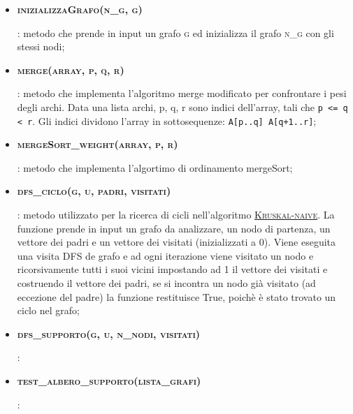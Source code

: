 \begin{itemize}
    
    \item \hypertarget{inizializzagrafo}{\textbf{\textsc{inizializzaGrafo(n\_g, g)}}}: metodo che prende in input un grafo \textsc{g} ed inizializza il grafo \textsc{n\_g} con gli stessi nodi;
    
    \item \hypertarget{merge}{\textbf{\textbf{\textsc{merge(array, p, q, r)}}}}: metodo che implementa l'algoritmo merge modificato per confrontare i pesi degli archi. Data una lista archi, p, q, r sono indici dell'array, tali che \texttt{p <= q < r}. Gli indici dividono l'array in sottosequenze: \texttt{A[p..q] A[q+1..r]};
    
    \item \hypertarget{mergesort}{\textbf{\textsc{mergeSort\_weight(array, p, r)}}}: metodo che implementa l'algortimo di ordinamento mergeSort;
    
    \item \hypertarget{dfsciclo}{\textbf{\textsc{dfs\_ciclo(g, u, padri, visitati)}}}: metodo utilizzato per la ricerca di cicli nell'algoritmo \hyperlink{section.4}{\textsc{Kruskal-naive}}. La funzione prende in input un grafo da analizzare, un nodo di partenza, un vettore dei padri e un vettore dei visitati (inizializzati a 0). Viene eseguita una visita DFS de grafo e ad ogni iterazione viene visitato un nodo e ricorsivamente tutti i suoi vicini impostando ad 1 il vettore dei visitati e costruendo il vettore dei padri, se si incontra un nodo già visitato (ad eccezione del padre) la funzione restituisce True, poichè è stato trovato un ciclo nel grafo;
    
    \item \hypertarget{dfssupporto}{\textbf{\textsc{dfs\_supporto(g, u, n\_nodi, visitati)}}}: 
    
    \item \hypertarget{testalberosupporto}{\textbf{\textsc{test\_albero\_supporto(lista\_grafi)}}}: 
    
    
\end{itemize} 

